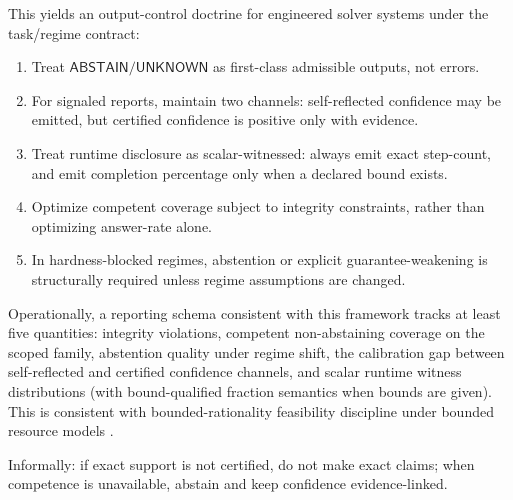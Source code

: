 This yields an output-control doctrine for engineered solver systems under the task/regime contract:
\begin{enumerate}
\item Treat $\mathsf{ABSTAIN}/\mathsf{UNKNOWN}$ as first-class admissible outputs, not errors.
\item For signaled reports, maintain two channels: self-reflected confidence may be emitted, but certified confidence is positive only with evidence.
\item Treat runtime disclosure as scalar-witnessed: always emit exact step-count, and emit completion percentage only when a declared bound exists.
\item Optimize competent coverage subject to integrity constraints, rather than optimizing answer-rate alone.
\item In hardness-blocked regimes, abstention or explicit guarantee-weakening is structurally required unless regime assumptions are changed.
\end{enumerate}

Operationally, a reporting schema consistent with this framework tracks at least five quantities: integrity violations, competent non-abstaining coverage on the scoped family, abstention quality under regime shift, the calibration gap between self-reflected and certified confidence channels, and scalar runtime witness distributions (with bound-qualified fraction semantics when bounds are given). This is consistent with bounded-rationality feasibility discipline under bounded resource models \cite{sep_bounded_rationality,arora2009computational}.

Informally: if exact support is not certified, do not make exact claims; when competence is unavailable, abstain and keep confidence evidence-linked.


\appendix
